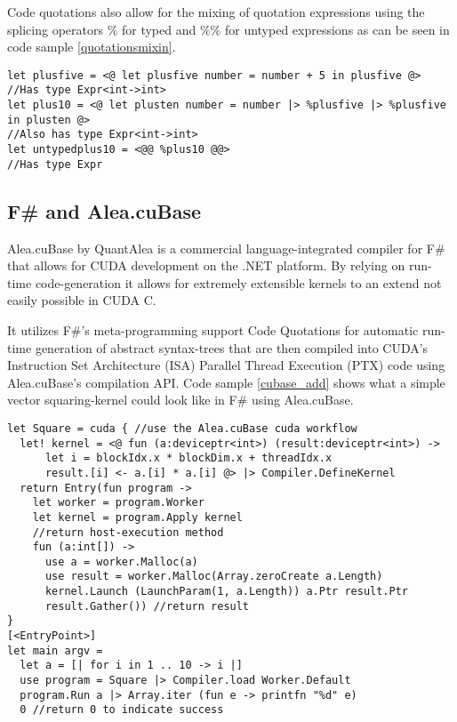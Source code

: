 Code quotations also allow for the mixing of quotation expressions using the splicing operators $\%$ for typed and $\%\%$ for untyped expressions as can be seen in code sample \ref{quotationsmixin}.

\begin{lstlisting}[caption=Quotation mixing, label=quotationsmixin]
let plusfive = <@ let plusfive number = number + 5 in plusfive @>
//Has type Expr<int->int>
let plus10 = <@ let plusten number = number |> %plusfive |> %plusfive in plusten @>
//Also has type Expr<int->int>
let untypedplus10 = <@@ %plus10 @@>
//Has type Expr
\end{lstlisting}


\subsection{F\# and Alea.cuBase}
Alea.cuBase by QuantAlea\cite{quantalea} is a commercial language-integrated compiler for F\# that allows for CUDA development on the .NET platform.
By relying on run-time code-generation it allows for extremely extensible kernels to an extend not easily possible in CUDA C.

It utilizes F\#'s meta-programming support Code Quotations for automatic run-time generation of abstract syntax-trees that are then compiled into CUDA's Instruction Set Architecture (ISA) Parallel Thread Execution (PTX) code using Alea.cuBase's compilation API.
Code sample \ref{cubase_add} shows what a simple vector squaring-kernel could look like in F\# using Alea.cuBase.

\begin{lstlisting}[caption=Alea.cuBase square kernel, label=cubase_add]
let Square = cuda { //use the Alea.cuBase cuda workflow
  let! kernel = <@ fun (a:deviceptr<int>) (result:deviceptr<int>) ->
      let i = blockIdx.x * blockDim.x + threadIdx.x
      result.[i] <- a.[i] * a.[i] @> |> Compiler.DefineKernel
  return Entry(fun program ->
    let worker = program.Worker
    let kernel = program.Apply kernel
    //return host-execution method
    fun (a:int[]) ->
      use a = worker.Malloc(a)
      use result = worker.Malloc(Array.zeroCreate a.Length)
      kernel.Launch (LaunchParam(1, a.Length)) a.Ptr result.Ptr
      result.Gather()) //return result
}
[<EntryPoint>]
let main argv = 
  let a = [| for i in 1 .. 10 -> i |]
  use program = Square |> Compiler.load Worker.Default
  program.Run a |> Array.iter (fun e -> printfn "%d" e)
  0 //return 0 to indicate success
\end{lstlisting}

